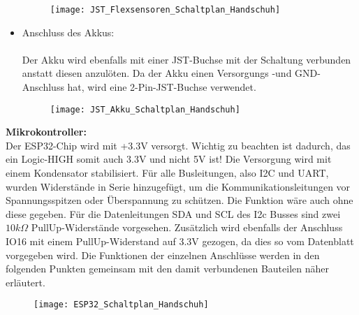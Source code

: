 \documentclass[11pt]{article}
\begin{document}
\begin{itemize}
\begin{figure}[H]
			\begin{center}
				\scalebox{0.5}
				{\texttt{[image: JST\_Flexsensoren\_Schaltplan\_Handschuh]}}
			\end{center}
		\end{figure}
	\item Anschluss des Akkus: \\
		  \\
		  Der Akku wird ebenfalls mit einer JST-Buchse mit der Schaltung verbunden anstatt diesen anzulöten. Da der Akku einen
		  Versorgungs -und GND-Anschluss hat, wird eine 2-Pin-JST-Buchse verwendet. \\
		  \begin{figure}[H]
			\begin{center}
				\scalebox{0.5}
				{\texttt{[image: JST\_Akku\_Schaltplan\_Handschuh]}}
			\end{center}
		\end{figure}\end{itemize}

\textbf{Mikrokontroller:} 
\\
Der ESP32-Chip wird mit +3.3V versorgt. Wichtig zu beachten ist dadurch, das ein Logic-HIGH somit auch 3.3V und nicht 5V ist!
Die Versorgung wird mit einem Kondensator stabilisiert. Für alle Busleitungen, also I2C und UART, wurden Widerstände in Serie
hinzugefügt, um die Kommunikationsleitungen vor Spannungsspitzen oder Überspannung zu schützen. Die Funktion wäre auch ohne diese
gegeben. Für die Datenleitungen SDA und SCL des I2c Busses sind zwei $10k\Omega$ PullUp-Widerstände vorgesehen. Zusätzlich 
wird ebenfalls der Anschluss IO16 mit einem PullUp-Widerstand auf 3.3V gezogen, da dies so vom Datenblatt vorgegeben wird. 
Die Funktionen der einzelnen Anschlüsse werden in den folgenden Punkten gemeinsam mit den damit verbundenen Bauteilen näher erläutert. \\
\begin{figure}[H]
	\begin{center}
		\scalebox{0.5}
		{\texttt{[image: ESP32\_Schaltplan\_Handschuh]}}
	\end{center}
\end{figure}
\end{document}
